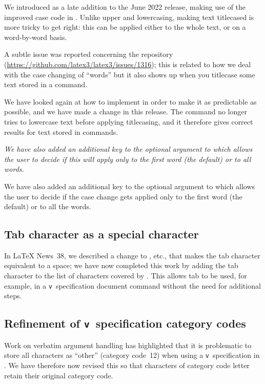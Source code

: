 \documentclass{ltnews}
\newenvironment{old}{\par\itshape}{\par}  %
\begin{document}
We introduced  as a late addition to the June 2022
release, making use of the improved case code in . Unlike
upper and lowercasing, making text titlecased is more tricky to get
right: this can be applied either
to the whole text, or on a word-by-word
basis.

A subtle issue was reported concerning the  repository
(\url{https://github.com/latex3/latex3/issues/1316}); this
is related to 
how we deal with the case changing of \enquote{words} but it also
shows up when you titlecase some text stored in a command.

We have looked again at how to implement  in order to make it as
predictable as possible, and we have made a change in this release. The
command no longer tries to lowercase text before applying titlecasing,
and it therefore gives correct results for text stored in commands.

\begin{old}
We have also added an additional key to the optional argument to
 which allows the user to decide if this will apply
only to the first word (the default) or to all words.
\end{old}


We have also added an additional key to the optional argument to
 which allows the user to decide if the case change gets applied 
only to the first word (the default) or to all the words.


\subsection{Tab character as a special character}

In \LaTeX{} News~38, we described a change to , etc., that
makes the tab character equivalent to a space; we have now completed
this work by adding the tab character to the list of characters
covered by .  This allows tab to be used, for example,
in a \texttt{v}~specification document command without the need for
additional steps.


\subsection{Refinement of \texttt{v}~specification category codes}

Work on verbatim argument handling has highlighted that 
it is problematic to store all
characters as \enquote{other} (category code~12) when using a
\texttt{v}~specification in . We have therefore now
revised this
so that characters of category code letter retain their original category code.
\end{document}
